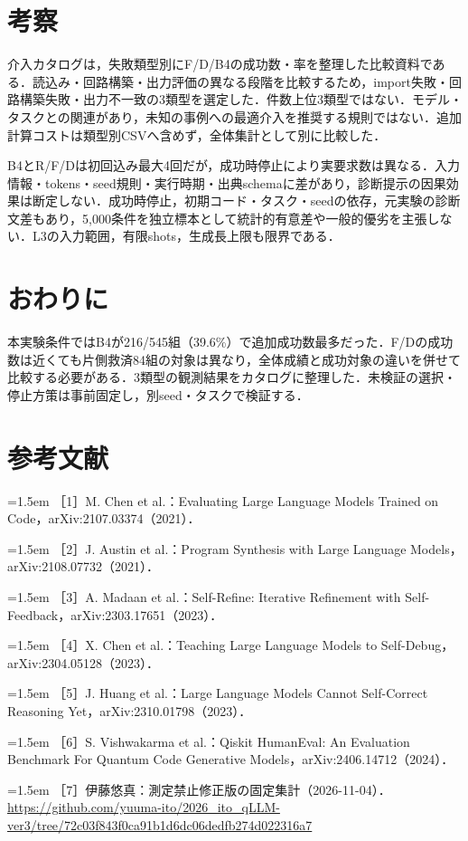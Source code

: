 \documentclass[a4paper,10pt,twocolumn]{extarticle}
\begin{document}
\section{考察}
介入カタログは，失敗類型別にF/D/B4の成功数・率を整理した比較資料である．読込み・回路構築・出力評価の異なる段階を比較するため，import失敗・回路構築失敗・出力不一致の3類型を選定した．件数上位3類型ではない．モデル・タスクとの関連があり，未知の事例への最適介入を推奨する規則ではない．追加計算コストは類型別CSVへ含めず，全体集計として別に比較した．

B4とR/F/Dは初回込み最大4回だが，成功時停止により実要求数は異なる．入力情報・tokens・seed規則・実行時期・出典schemaに差があり，診断提示の因果効果は断定しない．成功時停止，初期コード・タスク・seedの依存，元実験の診断文差もあり，5,000条件を独立標本として統計的有意差や一般的優劣を主張しない．L3の入力範囲，有限shots，生成長上限も限界である．

\section{おわりに}
本実験条件ではB4が216/545組（39.6\%）で追加成功数最多だった．F/Dの成功数は近くても片側救済84組の対象は異なり，全体成績と成功対象の違いを併せて比較する必要がある．3類型の観測結果をカタログに整理した．未検証の選択・停止方策は事前固定し，別seed・タスクで検証する．

\section*{参考文献}
{\raggedright\noindent\hangindent=1.5em ［1］M. Chen et al.：Evaluating Large Language Models Trained on Code，arXiv:2107.03374（2021）．\par}

{\raggedright\noindent\hangindent=1.5em ［2］J. Austin et al.：Program Synthesis with Large Language Models，arXiv:2108.07732（2021）．\par}

{\raggedright\noindent\hangindent=1.5em ［3］A. Madaan et al.：Self-Refine: Iterative Refinement with Self-Feedback，arXiv:2303.17651（2023）．\par}

{\raggedright\noindent\hangindent=1.5em ［4］X. Chen et al.：Teaching Large Language Models to Self-Debug，arXiv:2304.05128（2023）．\par}

{\raggedright\noindent\hangindent=1.5em ［5］J. Huang et al.：Large Language Models Cannot Self-Correct Reasoning Yet，arXiv:2310.01798（2023）．\par}

{\raggedright\noindent\hangindent=1.5em ［6］S. Vishwakarma et al.：Qiskit HumanEval: An Evaluation Benchmark For Quantum Code Generative Models，arXiv:2406.14712（2024）．\par}

{\raggedright\noindent\hangindent=1.5em ［7］伊藤悠真：測定禁止修正版の固定集計（2026-11-04）．\url{https://github.com/yuuma-ito/2026_ito_qLLM-ver3/tree/72c03f843f0ca91b1d6dc06dedfb274d022316a7}\par}
\end{document}
